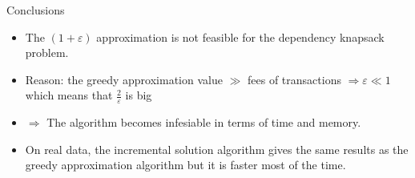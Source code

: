 \documentclass{beamer}
\begin{document}
\begin{frame}{Conclusions} %
    \begin{itemize}
        \item {The $(1+\varepsilon)$ approximation is not feasible for the dependency knapsack problem.} \item {Reason: the greedy approximation value $\gg$ fees of transactions $\Rightarrow \varepsilon \ll 1$ which means that $\frac{2}{\varepsilon}$ is big}
        \item { $\Rightarrow$ The algorithm becomes infesiable in terms of time and memory.}
        \item {On real data, the incremental solution algorithm gives the same results as the greedy approximation algorithm but it is faster most of the time.}
    \end{itemize}
\end{frame}
\end{document}
